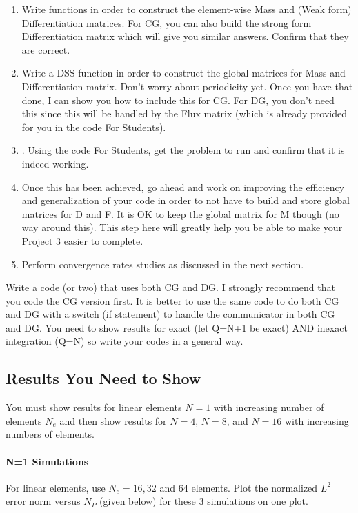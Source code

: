 \documentclass[10pt]{article}
\begin{document}
\begin{enumerate}
\item Write functions in order to construct the element-wise Mass and (Weak form) Differentiation matrices.  For CG, you can also build the strong form Differentiation matrix which will give you similar answers. Confirm that they are correct.
\item Write a DSS function in order to construct the global matrices for Mass and Differentiation matrix.  Don't worry about periodicity yet.  Once you have that done, I can show you how to include this for CG. For DG, you don't need this since this will be handled by the Flux matrix (which is already provided for you in the code For Students).
\item. Using the code For Students, get the problem to run and confirm that it is indeed working.
\item Once this has been achieved, go ahead and work on improving the efficiency and generalization of your code in order to not have to build and store global matrices for D and F.  It is OK to keep the global matrix for M though (no way around this). This step here will greatly help you be able to make your Project 3 easier to complete.
\item Perform convergence rates studies as discussed in the next section.
\end{enumerate}
Write a code (or two) that uses both CG and DG.  I strongly recommend
that you code the CG version first. It is better to use the same code
to do both CG and DG with a switch (if statement) to handle the
communicator in both CG and DG.
You need to show results for exact (let Q=N+1 be exact) AND inexact integration (Q=N) so write your codes in a general way. 

\subsection{Results You Need to Show}
You must show results for linear elements $N=1$ with increasing number of elements $N_e$ and then show results for 
$N=4$, $N=8$, and $N=16$ with increasing numbers of elements.

\paragraph{N=1 Simulations}
For linear elements, use $N_e=16, 32$ and 64 elements.
Plot the normalized $L^2$ error norm versus $N_P$ (given below) for these 3 simulations on one plot.
\end{document}
